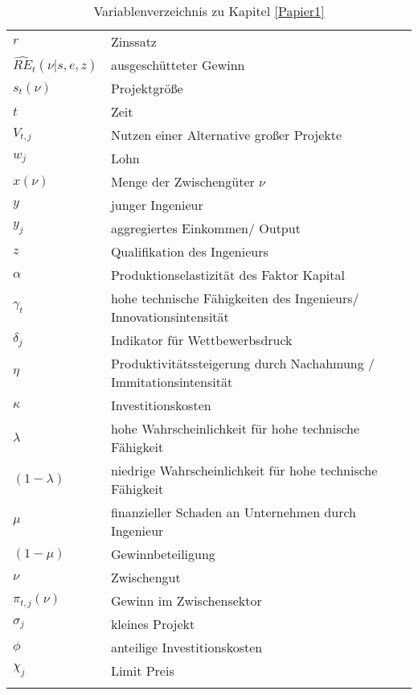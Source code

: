 \begin{longtable}{l|l}
		$r$ & Zinssatz\\
		$\hat{{RE}}_{t}(\nu|s,e,z)$ & ausgeschütteter Gewinn\\
		$s_{t}(\nu)$ & Projektgr\"o{\ss}e\\
		$t$ & Zeit\\
		$V_{t,j}$ & Nutzen einer Alternative gro\ss{}er Projekte\\
		$w_{j}$ & Lohn\\
		$x(\nu)$ & Menge der Zwischeng\"uter $\nu$\\
		$y$ & junger Ingenieur\\
		$y_{j}$ & aggregiertes Einkommen/ Output \\
		$z$ & Qualifikation des Ingenieurs\\
		$\alpha$ & Produktionselastizit\"at des Faktor Kapital\\
		$\gamma_{t}$ & hohe technische F\"ahigkeiten des Ingenieurs/ Innovationsintensität\\
		$\delta_{j}$ & Indikator f\"ur Wettbewerbsdruck\\
		$\eta$ & Produktivitätssteigerung durch Nachahmung / Immitationsintensität\\
		$\kappa$ & Investitionskosten\\
		$\lambda $ & hohe Wahrscheinlichkeit f\"ur hohe technische F\"ahigkeit\\
		$(1-\lambda)$ & niedrige Wahrscheinlichkeit f\"ur hohe technische F\"ahigkeit\\
		$\mu$ & finanzieller Schaden an Unternehmen durch Ingenieur\\
		$(1-\mu)$ & Gewinnbeteiligung\\
		$\nu$ & Zwischengut\\
		$\pi_{t,j}(\nu)$ & Gewinn im Zwischensektor\\%
		$\sigma_{j}$ & kleines Projekt\\
		$\phi$ & anteilige Investitionskosten\\
		$\chi_{j}$ & Limit Preis\\
		
\caption{Variablenverzeichnis zu Kapitel \ref{Papier1}}
\end{longtable}
